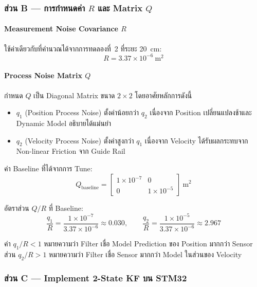 \subsubsection{ส่วน B --- การกำหนดค่า $R$ และ Matrix $Q$}

\paragraph{Measurement Noise Covariance $R$}
ใช้ค่าเดียวกับที่คำนวณได้จากการทดลองที่~2 ที่ระยะ 20~cm:
\begin{equation}
    R = 3.37 \times 10^{-6}\ \text{m}^2
    \label{eq:R_exp5_measured}
\end{equation}

\paragraph{Process Noise Matrix $Q$}
กำหนด $Q$ เป็น Diagonal Matrix ขนาด $2\times2$ โดยอาศัยหลักการดังนี้
\begin{itemize}
    \item $q_1$ (Position Process Noise) ตั้งค่าน้อยกว่า $q_2$
          เนื่องจาก Position เปลี่ยนแปลงช้าและ Dynamic Model อธิบายได้แม่นยำ
    \item $q_2$ (Velocity Process Noise) ตั้งค่าสูงกว่า $q_1$
          เนื่องจาก Velocity ได้รับผลกระทบจาก Non-linear Friction จาก Guide Rail
\end{itemize}

ค่า Baseline ที่ได้จากการ Tune:
\begin{equation}
    Q_\text{baseline} = \begin{bmatrix} 1\times10^{-7} & 0 \\ 0 & 1\times10^{-5} \end{bmatrix}
    \ \text{m}^2
    \label{eq:Q_baseline}
\end{equation}

อัตราส่วน $Q/R$ ที่ Baseline:
\begin{equation}
    \frac{q_1}{R} = \frac{1\times10^{-7}}{3.37\times10^{-6}} \approx 0.030, \qquad
    \frac{q_2}{R} = \frac{1\times10^{-5}}{3.37\times10^{-6}} \approx 2.967
    \label{eq:QR_ratio}
\end{equation}

ค่า $q_1/R < 1$ หมายความว่า Filter เชื่อ Model Prediction ของ Position มากกว่า Sensor
ส่วน $q_2/R > 1$ หมายความว่า Filter เชื่อ Sensor มากกว่า Model ในส่วนของ Velocity

\subsubsection{ส่วน C --- Implement 2-State KF บน STM32}


